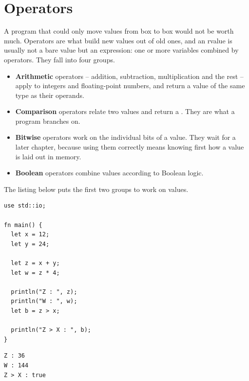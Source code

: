 \vfill\pagebreak%
\section{Operators}
\label{sec:types:operators}

A program that could only move values from box to box would not be worth much.
Operators are what build new values out of old ones, and an rvalue is usually not
a bare value but an expression: one or more variables combined by operators. They
fall into four groups.

\vspace{-5pt}%
\begin{itemize}
  \setlength\itemsep{-4pt}
\item \textbf{Arithmetic} operators -- addition, subtraction, multiplication and
  the rest -- apply to integers and floating-point numbers, and return a value of
  the same type as their operands.
\smallskip{}

\item \textbf{Comparison} operators relate two values and return a
  . They are what a program branches on.
\smallskip{}

\item \textbf{Bitwise} operators work on the individual bits of a value. They
  wait for a later chapter, because using them correctly means knowing first how
  a value is laid out in memory.
\smallskip{}

\item \textbf{Boolean} operators combine  values according to
  Boolean logic.
  \smallskip{}

\end{itemize}

The listing below puts the first two groups to work on  values.

\begin{lstlisting}[style=coloredverbatim, label=lst:types:operator_example, caption=Example of basic operators on \token{i32} values]
use std::io;

fn main() {
  let x = 12;
  let y = 24;

  let z = x + y;
  let w = z * 4;

  println("Z : ", z);
  println("W : ", w);
  let b = z > x;

  println("Z > X : ", b);
}
\end{lstlisting}
\vspace{-10pt}%
\begin{lstlisting}[style=bashVerb, label=lst:types:operator_example_output]
Z : 36
W : 144
Z > X : true
\end{lstlisting}

